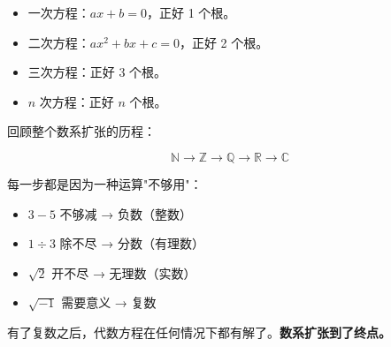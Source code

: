 \begin{itemize}
  \item 一次方程：$ax+b=0$，正好 1 个根。
  \item 二次方程：$ax^2+bx+c=0$，正好 2 个根。
  \item 三次方程：正好 3 个根。
  \item $n$ 次方程：正好 $n$ 个根。
\end{itemize}

回顾整个数系扩张的历程：

\[
\mathbb{N} \to \mathbb{Z} \to \mathbb{Q} \to \mathbb{R} \to \mathbb{C}
\]

每一步都是因为一种运算"不够用"：

\begin{itemize}
  \item $3-5$ 不够减 → 负数（整数）
  \item $1\div3$ 除不尽 → 分数（有理数）
  \item $\sqrt{2}$ 开不尽 → 无理数（实数）
  \item $\sqrt{-1}$ 需要意义 → 复数
\end{itemize}

有了复数之后，代数方程在任何情况下都有解了。\textbf{数系扩张到了终点。}

